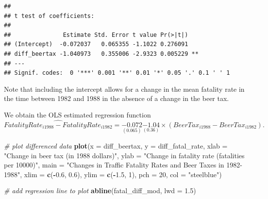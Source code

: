 \documentclass[]{book}
\newenvironment{Shaded}{\begin{snugshade}}{\end{snugshade}}
\newcommand{\KeywordTok}[1]{\textcolor[rgb]{0.13,0.29,0.53}{\textbf{#1}}}
\newcommand{\DataTypeTok}[1]{\textcolor[rgb]{0.13,0.29,0.53}{#1}}
\newcommand{\DecValTok}[1]{\textcolor[rgb]{0.00,0.00,0.81}{#1}}
\newcommand{\FloatTok}[1]{\textcolor[rgb]{0.00,0.00,0.81}{#1}}
\newcommand{\StringTok}[1]{\textcolor[rgb]{0.31,0.60,0.02}{#1}}
\newcommand{\CommentTok}[1]{\textcolor[rgb]{0.56,0.35,0.01}{\textit{#1}}}
\newcommand{\OperatorTok}[1]{\textcolor[rgb]{0.81,0.36,0.00}{\textbf{#1}}}
\newcommand{\NormalTok}[1]{#1}
\theoremstyle{definition}
\theoremstyle{definition}
\theoremstyle{definition}
\theoremstyle{remark}
\begin{document}
\begin{Shaded}
\end{Shaded}

\begin{verbatim}
## 
## t test of coefficients:
## 
##               Estimate Std. Error t value Pr(>|t|)   
## (Intercept)  -0.072037   0.065355 -1.1022 0.276091   
## diff_beertax -1.040973   0.355006 -2.9323 0.005229 **
## ---
## Signif. codes:  0 '***' 0.001 '**' 0.01 '*' 0.05 '.' 0.1 ' ' 1
\end{verbatim}

Note that including the intercept allows for a change in the mean
fatality rate in the time between 1982 and 1988 in the absence of a
change in the beer tax.

We obtain the OLS estimated regression function
\[\widehat{FatalityRate_{i1988} - FatalityRate_{i1982}} = \underset{(0.065)}{-0.072} \underset{(0.36)}{-1.04} \times (BeerTax_{i1988}-BeerTax_{i1982}).\]

\begin{Shaded}
\begin{Highlighting}[]
\CommentTok{# plot differenced data}
\KeywordTok{plot}\NormalTok{(}\DataTypeTok{x =}\NormalTok{ diff_beertax, }
     \DataTypeTok{y =}\NormalTok{ diff_fatal_rate, }
     \DataTypeTok{xlab =} \StringTok{"Change in beer tax (in 1988 dollars)"}\NormalTok{,}
     \DataTypeTok{ylab =} \StringTok{"Change in fatality rate (fatalities per 10000)"}\NormalTok{,}
     \DataTypeTok{main =} \StringTok{"Changes in Traffic Fatality Rates and Beer Taxes in 1982-1988"}\NormalTok{,}
     \DataTypeTok{xlim =} \KeywordTok{c}\NormalTok{(}\OperatorTok{-}\FloatTok{0.6}\NormalTok{, }\FloatTok{0.6}\NormalTok{),}
     \DataTypeTok{ylim =} \KeywordTok{c}\NormalTok{(}\OperatorTok{-}\FloatTok{1.5}\NormalTok{, }\DecValTok{1}\NormalTok{),}
     \DataTypeTok{pch =} \DecValTok{20}\NormalTok{, }
     \DataTypeTok{col =} \StringTok{"steelblue"}\NormalTok{)}

\CommentTok{# add regression line to plot}
\KeywordTok{abline}\NormalTok{(fatal_diff_mod, }\DataTypeTok{lwd =} \FloatTok{1.5}\NormalTok{)}
\end{Highlighting}
\end{Shaded}
\end{document}
